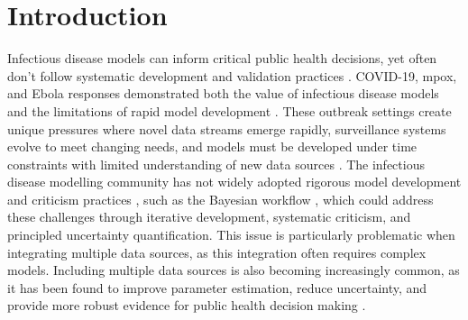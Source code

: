 \documentclass{article}
\begin{document}
\tableofcontents
\newpage

\section{Introduction}

Infectious disease models can inform critical public health decisions, yet often don't follow systematic development and validation practices \citep{Ward2024-sp, Fyles2024-qz, Abbott2021-delta, Abbott2022-prevalence}.
COVID-19, mpox, and Ebola responses demonstrated both the value of infectious disease models and the limitations of rapid model development \citep{knock2021key, ro2025estimating, Abbott2021-delta, Abbott2022-prevalence, Ward2024-sp, birrell2025real}.
These outbreak settings create unique pressures where novel data streams emerge rapidly, surveillance systems evolve to meet changing needs, and models must be developed under time constraints with limited understanding of new data sources \citep{mccaw2023role}.
The infectious disease modelling community has not widely adopted rigorous model development and criticism practices \citep{box1979robustness}, such as the Bayesian workflow \citep{green2003highly,gelman2020bayesian, nicholson2022interoperability}, which could address these challenges through iterative development, systematic criticism, and principled uncertainty quantification.
This issue is particularly problematic when integrating multiple data sources, as this integration often requires complex models.
Including multiple data sources is also becoming increasingly common, as it has been found to improve parameter estimation, reduce uncertainty, and provide more robust evidence for public health decision making \citep{deangelis2018analysing, sherratt2021exploring}.
\end{document}
